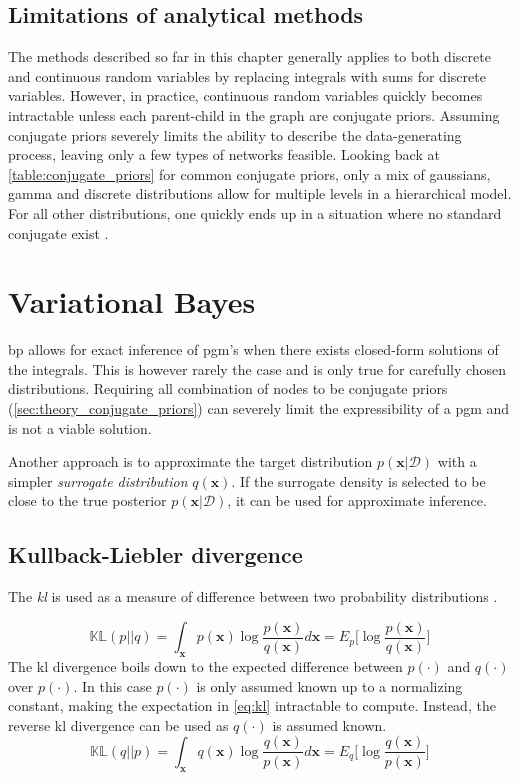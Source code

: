 \subsection{Limitations of analytical methods}
The methods described so far in this chapter generally applies to both discrete and continuous random variables by replacing integrals with sums for discrete variables. However, in practice, continuous random variables quickly becomes intractable unless each parent-child in the graph are conjugate priors. Assuming conjugate priors severely limits the ability to describe the data-generating process, leaving only a few types of networks feasible. Looking back at \cref{table:conjugate_priors} for common conjugate priors, only a mix of gaussians, gamma and discrete distributions allow for multiple levels in a hierarchical model. For all other distributions, one quickly ends up in a situation where no standard conjugate exist \cite{winnbishop}. 
\section{Variational Bayes}
\acrshort{bp} allows for exact inference of \acrshort{pgm}'s when there exists closed-form solutions of the integrals. This is however rarely the case and is only true for carefully chosen distributions. Requiring all combination of nodes to be conjugate priors (\cref{sec:theory_conjugate_priors}) can severely limit the expressibility of a \acrshort{pgm} and is not a viable solution. 

Another approach is to approximate the target distribution $p(\mathbf{x} | \mathcal{D})$ with a simpler \textit{surrogate distribution} $q(\mathbf{x})$. If the surrogate density is selected to be close to the true posterior $p(\mathbf{x} | \mathcal{D})$, it can be used for approximate inference. 

\subsection{Kullback-Liebler divergence}
The \textit{\acrfull{kl}}  is used as a measure of difference between two probability distributions \cite{kullback1951,murphy}.

\begin{equation}\label{eq:kl}
    \mathbb{KL}(p || q) = \int_\mathbf{x} p(\mathbf{x}) \log \frac{p(\mathbf{x})}{q(\mathbf{x})} d\mathbf{x} = E_{p} \big[ \log \frac{p(\mathbf{x})}{q(\mathbf{x})} \big]
\end{equation}
The \acrshort{kl} divergence boils down to the expected difference between $p(\cdot)$ and $q(\cdot)$ over $p(\cdot)$.
In this case $p(\cdot)$ is only assumed known up to a normalizing constant, making the expectation in \cref{eq:kl} intractable to compute. Instead, the reverse \acrshort{kl} divergence can be used as $q(\cdot)$ is assumed known.
\begin{equation}\label{eq:reverse_kl}
    \mathbb{KL}(q || p) = \int_\mathbf{x} q(\mathbf{x}) \log \frac{q(\mathbf{x})}{p(\mathbf{x})} d\mathbf{x} = E_{q} \big[ \log \frac{q(\mathbf{x})}{p(\mathbf{x})} \big]
\end{equation}

